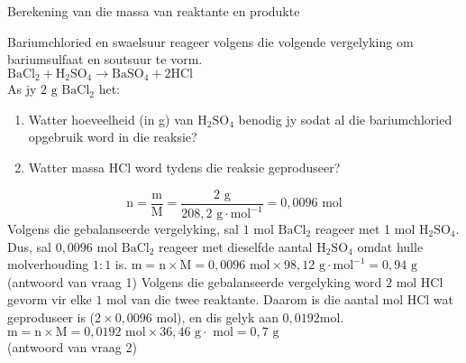       \begin{wex}{ Berekening van die massa van reaktante en produkte }
{
\begin{minipage}{\textwidth}
Bariumchloried en swaelsuur reageer volgens die volgende vergelyking om bariumsulfaat en soutsuur te vorm.\\
${\text{BaCl}}_{2}+{\text{H}}_{2}{\text{SO}}_{4}\to {\text{BaSO}}_{4}+2\text{HCl}$
\\
\label{m38717*id279141}As jy $2 \text{ g}$ $\text{BaCl}{}_{2}$ het:
\label{m38717*id279158}\begin{enumerate}[noitemsep, label=\textbf{\arabic*}. ] 
\item Watter hoeveelheid (in g) van $\text{H}{}_{2}\text{SO}{}_{4}$ benodig jy sodat al die bariumchloried opgebruik word in die reaksie?
\item Watter massa $\text{HCl}$ word tydens die reaksie geproduseer?
\end{enumerate}     
\end{minipage}
}
{
        
    \begin{equation*}
    \text{n}=\frac{\text{m}}{\text{M}}=\frac{2 \text{ g}}{208,2 \text{ g} \cdot \text{mol}^{-1}}=0,0096 \text{ mol}
      \end{equation*}
      \label{m38717*id279344}Volgens die gebalanseerde vergelyking, sal $1$ mol $\text{BaCl}{}_{2}$ reageer met 1 mol $\text{H}{}_{2}\text{SO}{}_{4}$. Dus, sal $0,0096 \text{ mol}$ $\text{BaCl}{}_{2}$ reageer met dieselfde aantal $\text{H}{}_{2}\text{SO}{}_{4}$ omdat hulle molverhouding $1:1$ is.
$ \text{m}=\text{n} \times \text{M} = 0,0096 \text{ mol} \times 98,12 \text{ g} \cdot \text{mol}^{-1} = 0,94 \text{ g}$ \\(antwoord van vraag 1) 
      \label{m38717*id279513}Volgens die gebalanseerde vergelyking word $2$ mol $\text{HCl}$ gevorm vir elke $1$ mol van die twee reaktante. Daarom is die aantal mol $\text{HCl}$ wat geproduseer is ($2 \times 0,0096 \text{ mol}$), en dis gelyk aan $0,0192 \text{mol}$.
   $\text{m}=\text{n} \times \text{M} = 0,0192 \text{ mol} \times 36,46 \text{ g} \cdot \text{ mol} = 0,7 \text{ g}$\\
(antwoord van vraag 2) 
}
\end{wex}
\clearpage
            



